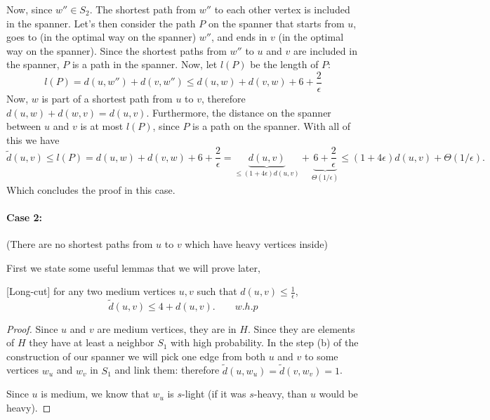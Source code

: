 \documentclass[11pt]{article}
\begin{document}
\begin{enumerate}
    Now, since $w''\in S_2$. The shortest path from $w''$ to each other vertex is included in the spanner. Let's then consider the path $P$ on the spanner that starts from $u$, goes to (in the optimal way on the spanner) $w''$, and ends in $v$ (in the optimal way on the spanner). Since the shortest paths from $w''$ to $u$ and $v$ are included in the spanner, $P$ is a path in the spanner. Now, let $l(P)$ be the length of $P$:
    \begin{equation*}
        l(P) = d(u,w'') + d(v,w'') \leq d(u,w) + d(v,w) + 6 + \frac{2}{\epsilon}
    \end{equation*}
    Now, $w$ is part of a shortest path from $u$ to $v$, therefore $d(u,w)+d(w,v)=d(u,v)$. Furthermore, the distance on the spanner between $u$ and $v$ is at most $l(P)$, since $P$ is a path on the spanner. With all of this we have
    \begin{equation*}
        \tilde d (u,v) \leq l(P) = d(u,w) + d(v,w) + 6+ \frac{2}{\epsilon} = \underbrace{d(u,v)}_{\leq (1+4\epsilon)d(u,v)} + \underbrace{6+ \frac{2}{\epsilon}}_{\Theta(1/\epsilon)} \leq (1+4\epsilon)d (u,v) + \Theta(1/\epsilon).
    \end{equation*}
    Which concludes the proof in this case.
    \paragraph{Case 2:} (There are no shortest paths from $u$ to $v$ which have heavy vertices inside)

    First we state some useful lemmas that we will prove later,
    \begin{lemma}\label{l1}[Long-cut] for any two medium vertices $u,v$ such that $d(u,v) \leq \frac{1}{\epsilon}$,
        \begin{equation*}
            \tilde d(u,v) \leq 4 + d(u,v).\qquad w.h.p
        \end{equation*}
    \end{lemma}
    \begin{proof}
        Since $u$ and $v$ are medium vertices, they are in $H$. Since they are elements of $H$ they have at least a neighbor $S_1$ with high probability. In the step (b) of the construction of our spanner we will pick one edge from both $u$ and $v$ to some vertices $w_u$ and $w_v$ in $S_1$ and link them: therefore $\tilde d (u,w_u) = \tilde d(v,w_v) = 1$.  
        
        Since $u$ is medium, we know that $w_u$ is $s$-light (if it was $s$-heavy, than $u$ would be heavy). 
        

\end{proof}
\end{enumerate}
\end{document}
